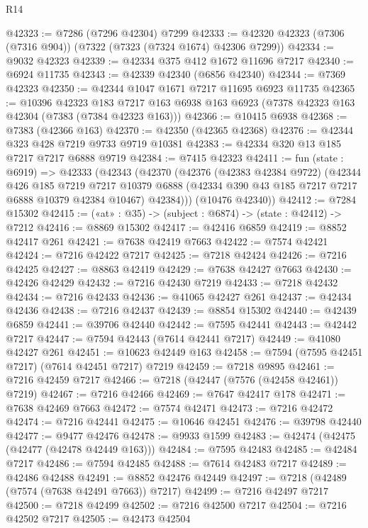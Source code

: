 \begin{lexlean}{R14}
\begin{coremodule}
@42323 := @7286 (@7296 @42304) @7299
@42333 := @42320 @42323 (@7306 (@7316 @904)) (@7322 (@7323 (@7324 @1674) @42306 @7299))
@42334 := @9032 @42323
@42339 := @42334 @375 @412 @1672 @11696 @7217
@42340 := @6924 @11735
@42343 := @42339 @42340 (@6856 @42340)
@42344 := @7369 @42323
@42350 := @42344 @1047 @1671 @7217 @11695 @6923 @11735
@42365 := @10396
    @42323
    @183
    @7217
    @163
    @6938
    @163
    @6923
    (@7378 @42323 @163 @42304 (@7383 (@7384 @42323 @163)))
@42366 := @10415 @6938
@42368 := @7383 (@42366 @163)
@42370 := @42350 (@42365 @42368)
@42376 := @42344 @323 @428 @7219 @9733 @9719 @10381
@42383 := @42334 @320 @13 @185 @7217 @7217 @6888 @9719
@42384 := @7415 @42323
@42411 := fun (state : @6919) =>
  @42333
    (@42343
      (@42370
        (@42376
          (@42383 @42384 @9722)
          (@42344
            @426
            @185
            @7219
            @7217
            @10379
            @6888
            (@42334 @390 @43 @185 @7217 @7217 @6888 @10379 @42384 @10467)
            @42384)))
      (@10476 @42340))
@42412 := @7284 @15302
@42415 := («at» : @35) -> (subject : @6874) -> (state : @42412) -> @7212
@42416 := @8869 @15302
@42417 := @42416 @6859
@42419 := @8852 @42417 @261
@42421 := @7638 @42419 @7663
@42422 := @7574 @42421
@42424 := @7216 @42422 @7217
@42425 := @7218 @42424
@42426 := @7216 @42425
@42427 := @8863 @42419
@42429 := @7638 @42427 @7663
@42430 := @42426 @42429
@42432 := @7216 @42430 @7219
@42433 := @7218 @42432
@42434 := @7216 @42433
@42436 := @41065 @42427 @261
@42437 := @42434 @42436
@42438 := @7216 @42437
@42439 := @8854 @15302
@42440 := @42439 @6859
@42441 := @39706 @42440
@42442 := @7595 @42441
@42443 := @42442 @7217
@42447 := @7594 @42443 (@7614 @42441 @7217)
@42449 := @41080 @42427 @261
@42451 := @10623 @42449 @163
@42458 := @7594 (@7595 @42451 @7217) (@7614 @42451 @7217) @7219
@42459 := @7218 @9895
@42461 := @7216 @42459 @7217
@42466 := @7218 (@42447 (@7576 (@42458 @42461)) @7219)
@42467 := @7216 @42466
@42469 := @7647 @42417 @178
@42471 := @7638 @42469 @7663
@42472 := @7574 @42471
@42473 := @7216 @42472
@42474 := @7216 @42441
@42475 := @10646 @42451
@42476 := @39798 @42440
@42477 := @9477 @42476
@42478 := @9933 @1599
@42483 := @42474 (@42475 (@42477 (@42478 @42449 @163)))
@42484 := @7595 @42483
@42485 := @42484 @7217
@42486 := @7594 @42485
@42488 := @7614 @42483 @7217
@42489 := @42486 @42488
@42491 := @8852 @42476 @42449
@42497 := @7218 (@42489 (@7574 (@7638 @42491 @7663)) @7217)
@42499 := @7216 @42497 @7217
@42500 := @7218 @42499
@42502 := @7216 @42500 @7217
@42504 := @7216 @42502 @7217
@42505 := @42473 @42504

\end{coremodule}
\end{lexlean}

